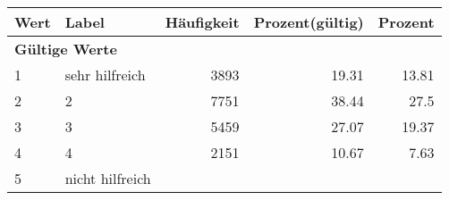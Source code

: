      \begin{longtable}{lXrrr}
     \toprule
     \textbf{Wert} & \textbf{Label} & \textbf{Häufigkeit} & \textbf{Prozent(gültig)} & \textbf{Prozent} \\
     \endhead
     \midrule
     \multicolumn{5}{l}{\textbf{Gültige Werte}}\\

     1 &
     \multicolumn{1}{X}{ sehr hilfreich   } &


       \num{3893} &
       \num[round-mode=places,round-precision=2]{19.31} &
         \num[round-mode=places,round-precision=2]{13.81} \\

     2 &
     \multicolumn{1}{X}{ 2   } &


       \num{7751} &
       \num[round-mode=places,round-precision=2]{38.44} &
         \num[round-mode=places,round-precision=2]{27.5} \\

     3 &
     \multicolumn{1}{X}{ 3   } &


       \num{5459} &
       \num[round-mode=places,round-precision=2]{27.07} &
         \num[round-mode=places,round-precision=2]{19.37} \\

     4 &
     \multicolumn{1}{X}{ 4   } &


       \num{2151} &
       \num[round-mode=places,round-precision=2]{10.67} &
         \num[round-mode=places,round-precision=2]{7.63} \\

     5 &
     \multicolumn{1}{X}{ nicht hilfreich   } &



\end{longtable}
